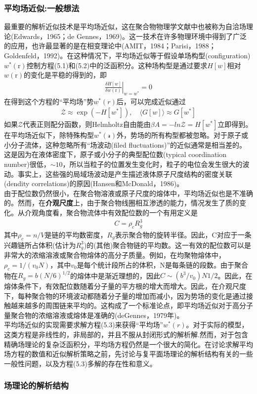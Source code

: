 \subsubsection{平均场近似:一般想法}
最重要的解析近似技术是平均场近似，这在聚合物物理学文献中也被称为自洽场理论(Edwards，1965；de Gennes，1969)。这一技术在许多物理环境中得到了广泛的应用，也许最显著的是在相变理论中(AMIT，1984；Parisi，1988；Goldenfeld，1992)。在这种情况下，平均场近似等于假设单场构型(configuration)$w^*(\mathrm{r})$控制方程(5.1)和(5.2)中的泛函积分。这种场构型是通过要求$H[w]$相对$w(\mathrm{r})$的变化是平稳的得到的，即\\
\begin{gather}
	\left.\frac{\delta H[w]}{\delta w(\mathrm{r})}\right|_{w=w^*} =0
\end{gather}
在得到这个方程的“平均场”势$w^*(r)$后，可以完成近似通过\\
\begin{gather}
	\mathcal{Z} \approx \exp(-H[w^*]),\quad \langle G[w]\rangle \approx G[w^*]
\end{gather}
如果$\mathcal{Z}$代表正则配分函数，则Helmholtz自由能由$\beta A=−ln\mathcal{Z}=H[w^*]$立即得到。\\

在平均场近似下，除特殊构型$w^*(\mathcal{r})$外，势场的所有构型都被忽略。对于原子或小分子流体，这种忽略所有“场波动(filed fluctuations)”的近似通常是相当差的。这是因为在液体密度下，原子或小分子的典型配位数(typical coordination number)很低，$\sim 10$，所以当粒子的位置发生变化时，粒子的电位会发生很大的波动。事实上，这些强的局域场波动是产生描述液体原子尺度结构的密度关联(dendity correlations)的原因(Hansen和McDonald，1986)。\\

由于配位数仍然很小，在聚合物溶液或原子尺度的熔体中，平均场近似也是不准确的。然而，在\textbf{介观尺度}上，由于聚合物线圈相互渗透的能力，情况发生了质的变化。从介观角度看，聚合物流体中有效配位数的一个有用定义是\\
\begin{gather}
	C=\rho_c R_g^3
\end{gather}
其中$\rho_c=n/V$是链的平均数密度，$R_g$表示聚合物的旋转半径。因此，C对应于一条兴趣链所占体积(估计为$R_g^3$)的(其他)聚合物链的平均数。这一有效的配位数可以是非常大的浓缩溶液或聚合物熔体的高分子质量。例如，在均聚物熔体中，$ρ_c=1/(v_0N)$，其中$v_0$是每个统计段所占的体积，N是每条链的段数。由于聚合物在$R_g=b(N/6)^{1/2}$的熔体中是渐近理想的，因此$C\sim (b^3/v_0)N{1/2}$。因此，在熔体条件下，有效配位数随着分子量的平方根的增大而增大。因此，在介观尺度下，每种聚合物的环境波动都随着分子量的增加而减小，因为势场的变化是通过接触越来越多的周围链来平均的。这构成了一个标准论点，即平均场近似对于高分子量聚合物的浓缩溶液或熔体是准确的(deGennes，1979年)。\\


平均场近似的实现需要求解方程(5.3)来获得“平均场”$w^*(r)$。对于实际的模型，这类方程是非线性的，非局部的，并且不服从封闭形式的解析解.然而，对于包含精确场理论的复杂泛函积分，平均场方程仍然是一个很大的简化。在讨论求解平均场方程的数值和近似解析策略之前，先讨论与复平面场理论的解析结构有关的一些一般性问题，以及方程(5.3)多解的存在性和意义。\\
\subsubsection{场理论的解析结构}


